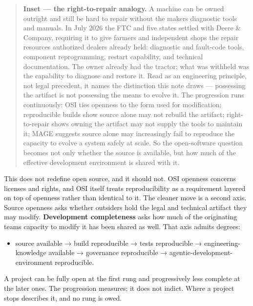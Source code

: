 \begin{quote}
\textbf{Inset --- the right-to-repair analogy.} A machine can be owned outright and still be hard to repair without the maker\textquotesingle s diagnostic tools and manuals. In July 2026 the FTC and five states settled with Deere \& Company, requiring it to give farmers and independent shops the repair resources authorized dealers already held: diagnostic and fault-code tools, component reprogramming, restart capability, and technical documentation.\citep{ftc2026deere} The owner already had the tractor; what was withheld was the capability to diagnose and restore it. Read as an engineering principle, not legal precedent, it names the distinction this note draws --- possessing the artifact is not possessing the means to evolve it. The progression runs continuously: OSI ties openness to the form used for modification; reproducible builds show source alone may not rebuild the artifact; right-to-repair shows owning the artifact may not supply the tools to maintain it; MAGE suggests source alone may increasingly fail to reproduce the capacity to evolve a system safely at scale. So the open-software question becomes not only whether the source is available, but how much of the effective development environment is shared with it.
\end{quote}

This does not redefine open source, and it should not. OSI openness concerns licenses and rights, and OSI itself treats reproducibility as a requirement layered on top of openness rather than identical to it. The cleaner move is a second axis. Source openness asks whether outsiders hold the legal and technical artifact they may modify. \textbf{Development completeness} asks how much of the originating team\textquotesingle s capacity to modify it has been shared as well. That axis admits degrees:

\begin{itemize}
\tightlist
\item
  source available → build reproducible → tests reproducible → engineering-knowledge available → governance reproducible → agentic-development-environment reproducible.
\end{itemize}

A project can be fully open at the first rung and progressively less complete at the later ones. The progression measures; it does not indict. Where a project stops describes it, and no rung is owed.

